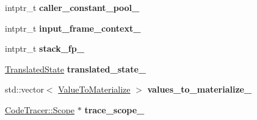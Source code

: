 \begin{DoxyCompactItemize}
\item 
intptr\+\_\+t {\bfseries caller\+\_\+constant\+\_\+pool\+\_\+}\hypertarget{classv8_1_1internal_1_1_deoptimizer_a18f3c81da24e0220197726d93eede109}{}\label{classv8_1_1internal_1_1_deoptimizer_a18f3c81da24e0220197726d93eede109}

\item 
intptr\+\_\+t {\bfseries input\+\_\+frame\+\_\+context\+\_\+}\hypertarget{classv8_1_1internal_1_1_deoptimizer_ab799a83016089ab27f0f77f695685a73}{}\label{classv8_1_1internal_1_1_deoptimizer_ab799a83016089ab27f0f77f695685a73}

\item 
intptr\+\_\+t {\bfseries stack\+\_\+fp\+\_\+}\hypertarget{classv8_1_1internal_1_1_deoptimizer_a88eaf33cb8e54875c0817df025dd6041}{}\label{classv8_1_1internal_1_1_deoptimizer_a88eaf33cb8e54875c0817df025dd6041}

\item 
\hyperlink{classv8_1_1internal_1_1_translated_state}{Translated\+State} {\bfseries translated\+\_\+state\+\_\+}\hypertarget{classv8_1_1internal_1_1_deoptimizer_aa4d11edb18a1368976304ae307d872b9}{}\label{classv8_1_1internal_1_1_deoptimizer_aa4d11edb18a1368976304ae307d872b9}

\item 
std\+::vector$<$ \hyperlink{structv8_1_1internal_1_1_deoptimizer_1_1_value_to_materialize}{Value\+To\+Materialize} $>$ {\bfseries values\+\_\+to\+\_\+materialize\+\_\+}\hypertarget{classv8_1_1internal_1_1_deoptimizer_af44cd7edc9b9fcc34a20bbab28486b4a}{}\label{classv8_1_1internal_1_1_deoptimizer_af44cd7edc9b9fcc34a20bbab28486b4a}

\item 
\hyperlink{classv8_1_1internal_1_1_code_tracer_1_1_scope}{Code\+Tracer\+::\+Scope} $\ast$ {\bfseries trace\+\_\+scope\+\_\+}\hypertarget{classv8_1_1internal_1_1_deoptimizer_ad97c21c2193fc90bfd880e1e2d913bf6}{}\label{classv8_1_1internal_1_1_deoptimizer_ad97c21c2193fc90bfd880e1e2d913bf6}

\end{DoxyCompactItemize}
